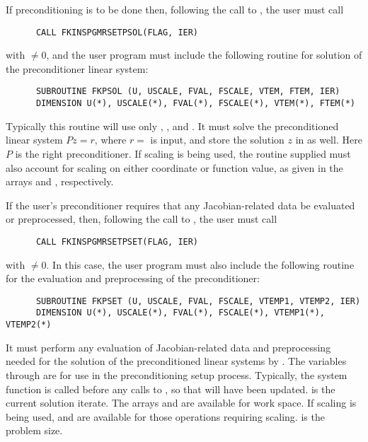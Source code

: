 \begin{Steps}
  If preconditioning is to be done then, following the
  call to , the user must call
\begin{verbatim}
      CALL FKINSPGMRSETPSOL(FLAG, IER)
\end{verbatim}
  with  $\neq 0$, and the user program must include the following routine
  for solution of the preconditioner linear system:
\begin{verbatim}
      SUBROUTINE FKPSOL (U, USCALE, FVAL, FSCALE, VTEM, FTEM, IER)
      DIMENSION U(*), USCALE(*), FVAL(*), FSCALE(*), VTEM(*), FTEM(*)
\end{verbatim}
  Typically this routine will use only , ,  and .
  It must solve the preconditioned linear system $Pz = r$, where
  $r = $  is input, and store the solution $z$ in  as well. 
  Here $P$ is the right preconditioner. If scaling is being used, the
  routine supplied must also account for scaling on either coordinate
  or function value, as given in the arrays  and
  , respectively.
  
  If the user's preconditioner requires that any Jacobian-related data be evaluated
  or preprocessed, then, following the call to , the user must
  call 
\begin{verbatim}
      CALL FKINSPGMRSETPSET(FLAG, IER)
\end{verbatim}
  with  $\neq 0$. In this case, the user program must also include
  the following routine for the evaluation and preprocessing of the preconditioner:
\begin{verbatim}
      SUBROUTINE FKPSET (U, USCALE, FVAL, FSCALE, VTEMP1, VTEMP2, IER)
      DIMENSION U(*), USCALE(*), FVAL(*), FSCALE(*), VTEMP1(*), VTEMP2(*)
\end{verbatim}
  It must perform any evaluation of Jacobian-related data and
  preprocessing needed for the solution of the preconditioned linear
  systems by . The variables  through  are for use in the
  preconditioning setup process. Typically, the system function  is
  called before any calls to , so that  will have
  been updated.  is the current solution
  iterate. The arrays  and  are available for work space. 
  If scaling is being used,  and  are available for those operations
  requiring scaling.  is the problem size.
  

\end{Steps}
